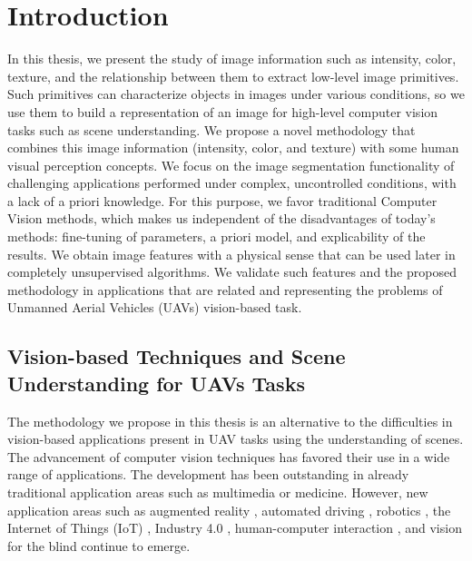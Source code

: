 \chapter*{Introduction}
In this thesis, we present the study of image information such as intensity, color, texture, and the relationship between them to extract low-level image primitives. Such primitives can characterize objects in images under various conditions, so we use them to build a representation of an image for high-level computer vision tasks such as scene understanding. We propose a novel methodology that combines this image information (intensity, color, and texture) with some human visual perception concepts. We focus on the image segmentation functionality of challenging applications performed under complex, uncontrolled conditions, with a lack of a priori knowledge. For this purpose, we favor traditional Computer Vision methods, which makes us independent of the disadvantages of today's methods: fine-tuning of parameters, a priori model, and explicability of the results. 
We obtain image features with a physical sense that can be used later in completely unsupervised algorithms. We validate such features and the proposed methodology in applications that are related and representing the problems of Unmanned Aerial Vehicles (UAVs) vision-based task.

\section*{Vision-based Techniques and Scene Understanding for UAVs Tasks}
The methodology we propose in this thesis is an alternative to the difficulties in vision-based applications present in UAV tasks using the understanding of scenes.
The advancement of computer vision techniques has favored their use in a wide range of applications. The development has been outstanding in already traditional application areas such as multimedia or medicine. However, new application areas such as augmented reality \citep{AbuAlhaija.Mustikovela.ea:IJCV:2018}, automated driving \citep{Janai.Guney.ea:CGV:2020}, robotics \citep{Sankowski.Nowakowski:BOOK:2014}, the Internet of Things (IoT) \citep{Othman.Aydin:CICN:2017}, Industry 4.0 \citep{Zhong.Xu.ea:ENG:2017}, human-computer interaction \citep{Ke.Liu.ea:BOOK5:2018}, and vision for the blind \citep{Ahmed.Balasubramanian.ea:IUI:2020} continue to emerge.

